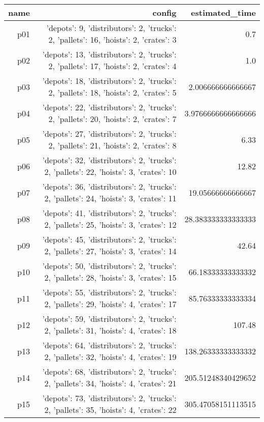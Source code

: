 \documentclass{article}
\begin{document}
                            \begin{center}
                            \scriptsize
                            \begin{tabular}{r|r|r}
                            name & config & estimated\_time\\\midrule
                              p01&{'depots': 9, 'distributors': 2, 'trucks': 2, 'pallets': 16, 'hoists': 2, 'crates': 3}&0.7\\
  p02&{'depots': 13, 'distributors': 2, 'trucks': 2, 'pallets': 17, 'hoists': 2, 'crates': 4}&1.0\\
  p03&{'depots': 18, 'distributors': 2, 'trucks': 2, 'pallets': 18, 'hoists': 2, 'crates': 5}&2.006666666666667\\
  p04&{'depots': 22, 'distributors': 2, 'trucks': 2, 'pallets': 20, 'hoists': 2, 'crates': 7}&3.9766666666666666\\
  p05&{'depots': 27, 'distributors': 2, 'trucks': 2, 'pallets': 21, 'hoists': 2, 'crates': 8}&6.33\\
  p06&{'depots': 32, 'distributors': 2, 'trucks': 2, 'pallets': 22, 'hoists': 3, 'crates': 10}&12.82\\
  p07&{'depots': 36, 'distributors': 2, 'trucks': 2, 'pallets': 24, 'hoists': 3, 'crates': 11}&19.05666666666667\\
  p08&{'depots': 41, 'distributors': 2, 'trucks': 2, 'pallets': 25, 'hoists': 3, 'crates': 12}&28.383333333333333\\
  p09&{'depots': 45, 'distributors': 2, 'trucks': 2, 'pallets': 27, 'hoists': 3, 'crates': 14}&42.64\\
  p10&{'depots': 50, 'distributors': 2, 'trucks': 2, 'pallets': 28, 'hoists': 3, 'crates': 15}&66.18333333333332\\
  p11&{'depots': 55, 'distributors': 2, 'trucks': 2, 'pallets': 29, 'hoists': 4, 'crates': 17}&85.76333333333334\\
  p12&{'depots': 59, 'distributors': 2, 'trucks': 2, 'pallets': 31, 'hoists': 4, 'crates': 18}&107.48\\
  p13&{'depots': 64, 'distributors': 2, 'trucks': 2, 'pallets': 32, 'hoists': 4, 'crates': 19}&138.26333333333332\\
  p14&{'depots': 68, 'distributors': 2, 'trucks': 2, 'pallets': 34, 'hoists': 4, 'crates': 21}&205.51248340429652\\
  p15&{'depots': 73, 'distributors': 2, 'trucks': 2, 'pallets': 35, 'hoists': 4, 'crates': 22}&305.47058151113515\\

\end{tabular}
\end{center}
\end{document}
